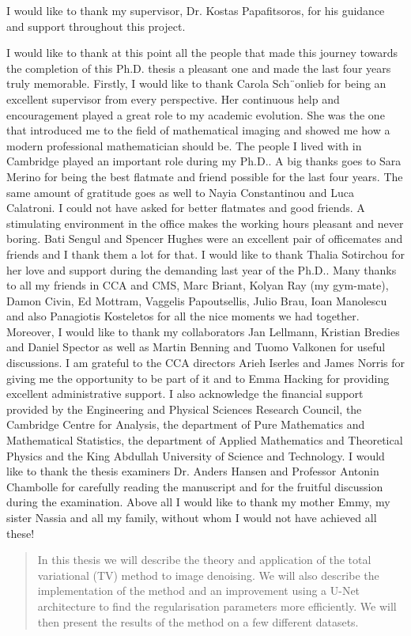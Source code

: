 \documentclass[12pt]{article}
\begin{document}
I would like to thank my supervisor, Dr. Kostas Papafitsoros, for his guidance and support throughout this project.

I would like to thank at this point all the people that made this journey towards
the completion of this Ph.D. thesis a pleasant one and made the last four years
truly memorable.
Firstly, I would like to thank Carola Sch¨onlieb for being an excellent supervisor
from every perspective. Her continuous help and encouragement played a
great role to my academic evolution. She was the one that introduced me to
the field of mathematical imaging and showed me how a modern professional
mathematician should be.
The people I lived with in Cambridge played an important role during my
Ph.D.. A big thanks goes to Sara Merino for being the best flatmate and
friend possible for the last four years. The same amount of gratitude goes as
well to Nayia Constantinou and Luca Calatroni. I could not have asked for
better flatmates and good friends.
A stimulating environment in the office makes the working hours pleasant
and never boring. Bati Sengul and Spencer Hughes were an excellent pair of
officemates and friends and I thank them a lot for that.
I would like to thank Thalia Sotirchou for her love and support during the
demanding last year of the Ph.D..
Many thanks to all my friends in CCA and CMS, Marc Briant, Kolyan Ray
(my gym-mate), Damon Civin, Ed Mottram, Vaggelis Papoutsellis, Julio Brau,
Ioan Manolescu and also Panagiotis Kosteletos for all the nice moments we had
together.
Moreover, I would like to thank my collaborators Jan Lellmann, Kristian
Bredies and Daniel Spector as well as Martin Benning and Tuomo Valkonen
for useful discussions.
I am grateful to the CCA directors Arieh Iserles and James Norris for giving me
the opportunity to be part of it and to Emma Hacking for providing excellent
administrative support. I also acknowledge the financial support provided
by the Engineering and Physical Sciences Research Council, the Cambridge
Centre for Analysis, the department of Pure Mathematics and Mathematical
Statistics, the department of Applied Mathematics and Theoretical Physics
and the King Abdullah University of Science and Technology.
I would like to thank the thesis examiners Dr. Anders Hansen and Professor
Antonin Chambolle for carefully reading the manuscript and for the fruitful
discussion during the examination.
Above all I would like to thank my mother Emmy, my sister Nassia and all my
family, without whom I would not have achieved all these!

\begin{abstract}


In this thesis we will describe the theory and application of the total variational (TV) method to image denoising. 
We will also describe the implementation of the method and an improvement using a U-Net architecture to find the regularisation parameters more efficiently. 
We will then present the results of the method on a few different datasets.
\end{abstract}
\end{document}
